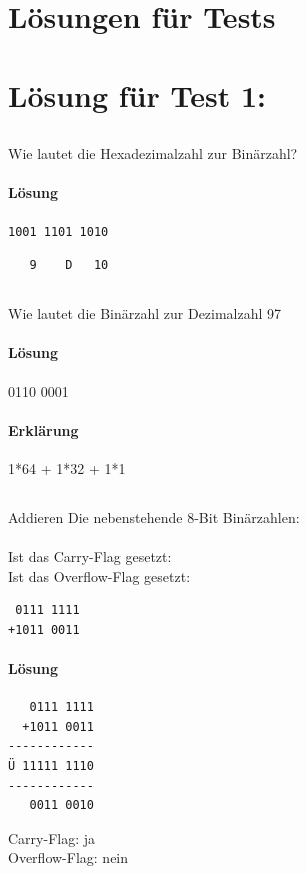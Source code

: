 \documentclass[12pt,twoside,a4paper]{article}
\begin{document}
\newpage
\section*{Lösungen für Tests}
\section{Lösung für Test 1:}
\subsection{}
Wie lautet die Hexadezimalzahl zur Binärzahl?
\paragraph{Lösung}
\begin{lstlisting}
1001 1101 1010
\end{lstlisting}
\begin{lstlisting}
   9    D   10 
\end{lstlisting}
\subsection{}
Wie lautet die Binärzahl zur Dezimalzahl 97
\paragraph{Lösung}
0110 0001
\paragraph{Erklärung}
1*64 + 1*32 + 1*1
\subsection{} 
Addieren Die nebenstehende 8-Bit Binärzahlen:\\
\\
Ist das Carry-Flag gesetzt:\\
Ist das Overflow-Flag gesetzt:
\begin{lstlisting}
 0111 1111
+1011 0011 
\end{lstlisting}
\paragraph{Lösung}
\begin{lstlisting}
   0111 1111
  +1011 0011
------------
Ü 11111 1110
------------
   0011 0010
\end{lstlisting}
Carry-Flag: 	ja\\
Overflow-Flag:	nein\\
\end{document}
